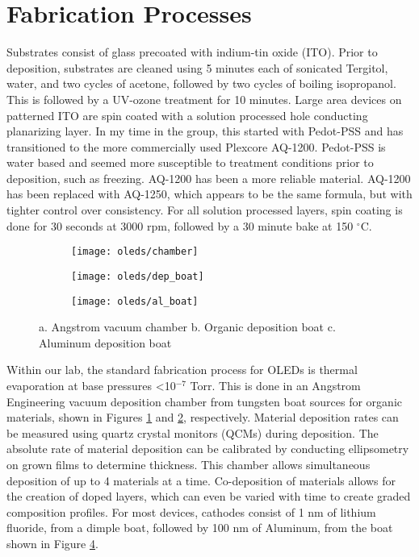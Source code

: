 \documentclass[../thesis.tex]{subfiles}
\begin{document}
\section{Fabrication Processes}

Substrates consist of glass precoated with indium-tin oxide (ITO).  
Prior to deposition, substrates are cleaned using 5 minutes each of sonicated Tergitol, water, and two cycles of acetone, followed by two cycles of boiling isopropanol.  
This is followed by a UV-ozone treatment for 10 minutes.  
Large area devices on patterned ITO are spin coated with a solution processed hole conducting planarizing layer.
In my time in the group, this started with Pedot-PSS and has transitioned to the more commercially used Plexcore AQ-1200.
Pedot-PSS is water based and seemed more susceptible to treatment conditions prior to deposition, such as freezing.
AQ-1200 has been a more reliable material.
AQ-1200 has been replaced with AQ-1250, which appears to be the same formula, but with tighter control over consistency.
For all solution processed layers, spin coating is done for 30 seconds at 3000 rpm, followed by a 30 minute bake at 150 $^\circ$C.

\begin{figure}[ht]
    \centering
    \begin{subfigure}{.3\textwidth}
    \texttt{[image: oleds/chamber]}
    \caption{}
    \label{fig:oleds_angstrom}\par\vfill
    \end{subfigure}
    \begin{subfigure}{.3\textwidth}
    \texttt{[image: oleds/dep\_boat]}
    \caption{}
    \label{fig:oleds_deposition_boat}
    \end{subfigure}
    \begin{subfigure}{.3\textwidth}
    \texttt{[image: oleds/al\_boat]}
    \caption{}
    \label{fig:oleds_al_boat}
    \end{subfigure}
\caption{a. Angstrom vacuum chamber b. Organic deposition boat c. Aluminum deposition boat}
\end{figure}

Within our lab, the standard fabrication process for OLEDs is thermal evaporation at base pressures <10$^{-7}$ Torr.  
This is done in an Angstrom Engineering vacuum deposition chamber from tungsten boat sources for organic materials, shown in Figures \ref{fig:oleds_angstrom} and \ref{fig:oleds_deposition_boat}, respectively.
Material deposition rates can be measured using quartz crystal monitors (QCMs) during deposition.
The absolute rate of material deposition can be calibrated by conducting ellipsometry on grown films to determine thickness.
This chamber allows simultaneous deposition of up to 4 materials at a time.
Co-deposition of materials allows for the creation of doped layers, which can even be varied with time to create graded composition profiles.
For most devices, cathodes consist of 1 nm of lithium fluoride, from a dimple boat, followed by 100 nm of Aluminum, from the boat shown in Figure \ref{fig:oleds_al_boat}.
\end{document}
